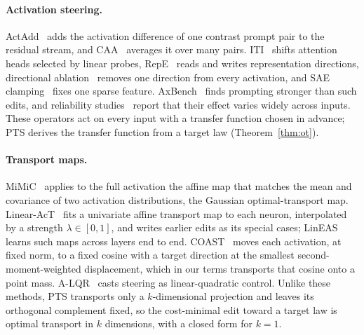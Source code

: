 \documentclass{article}
\begin{document}
\paragraph{Activation steering.} ActAdd~\citep{turner2023actadd} adds the
activation difference of one contrast prompt pair to the residual stream, and
CAA~\citep{rimsky2024caa} averages it over many pairs.
ITI~\citep{li2023iti} shifts attention heads selected by linear probes,
RepE~\citep{zou2023repe} reads and writes representation directions,
directional ablation~\citep{arditi2024refusal} removes one direction from every
activation, and SAE clamping~\citep{templeton2024scaling} fixes one sparse
feature. AxBench~\citep{wu2025axbench} finds prompting stronger than
such edits, and reliability
studies~\citep{tan2024generalisation,braun2025unreliability} report that their
effect varies widely across inputs. These operators act on every input
with a transfer function chosen in advance; PTS derives the transfer function
from a target law (Theorem~\ref{thm:ot}).

\paragraph{Transport maps.} MiMiC~\citep{singh2024mimic} applies to the full
activation the affine map that matches the mean and covariance of two
activation distributions, the Gaussian optimal-transport map.
Linear-AcT~\citep{rodriguez2025act} fits a univariate affine transport map to
each neuron, interpolated by a strength $\lambda\in[0,1]$, and writes earlier
edits as its special cases; LinEAS~\citep{rodriguez2025lineas} learns such maps
across layers end to end. COAST~\citep{nguyen2026coast} moves each activation,
at fixed norm, to a fixed cosine with a target direction at the smallest
second-moment-weighted displacement, which in our terms transports that cosine
onto a point mass. A-LQR~\citep{nguyen2026alqr} casts steering as
linear-quadratic control. Unlike these methods, PTS transports only a
$k$-dimensional projection and leaves its orthogonal complement fixed, so the
cost-minimal edit toward a target law is optimal transport in $k$ dimensions,
with a closed form for $k=1$.
\end{document}
